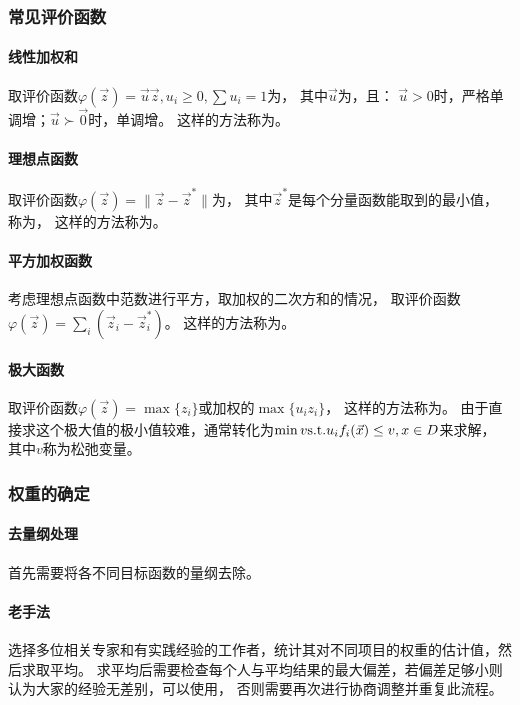 \subsubsection{常见评价函数}

\paragraph{线性加权和}
取评价函数$\varphi(\vec{z})=\vec{u}\vec{z},u_i\geq 0,\sum u_i=1$为，
其中$\vec{u}$为，且：
$\vec{u}>0$时，严格单调增；$\vec{u}\succ \vec{0}$时，单调增。
这样的方法称为。

\paragraph{理想点函数}
取评价函数$\varphi(\vec{z})=\|\vec{z}-\vec{z}^*\|$为，
其中$\vec{z}^*$是每个分量函数能取到的最小值，称为，
这样的方法称为。

\paragraph{平方加权函数}
考虑理想点函数中范数进行平方，取加权的二次方和的情况，
取评价函数$\varphi(\vec{z})=\sum\limits_i (\vec{z}_i-\vec{z}_i^*)$。
这样的方法称为。

\paragraph{极大函数}
取评价函数$\varphi(\vec{z})=\max\{z_i\}$或加权的$\max\{u_i z_i\}$，
这样的方法称为。
由于直接求这个极大值的极小值较难，通常转化为$\min v \mathrm{s.t.} u_i f_i(\vec{x})\leq v,x\in D$来求解，
其中$v$称为松弛变量。

\subsubsection{权重的确定}
\paragraph{去量纲处理}
首先需要将各不同目标函数的量纲去除。

\paragraph{老手法}
选择多位相关专家和有实践经验的工作者，统计其对不同项目的权重的估计值，然后求取平均。
求平均后需要检查每个人与平均结果的最大偏差，若偏差足够小则认为大家的经验无差别，可以使用，
否则需要再次进行协商调整并重复此流程。

